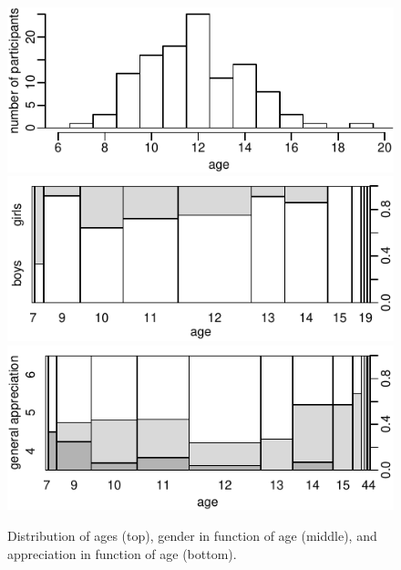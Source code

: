 \documentclass[letterpaper, 10 pt, conference]{ieeeconf}  %
\begin{document}
\begin{figure}
\includegraphics{figures/age-hist}
\includegraphics{figures/sex-wrt-age}
\includegraphics{figures/appreciation-wrt-age}
\caption{Distribution of ages (top), gender in function of age (middle), and appreciation in function of age (bottom).}
\label{fig:results-festival}
\end{figure}
\end{document}
